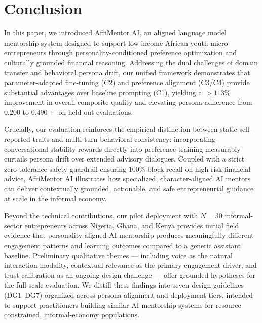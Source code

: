 \section{Conclusion}
\label{sec:conclusion}

In this paper, we introduced AfriMentor AI, an aligned language model mentorship system designed to support low-income African youth micro-entrepreneurs through personality-conditioned preference optimization and culturally grounded financial reasoning. Addressing the dual challenges of domain transfer and behavioral persona drift, our unified framework demonstrates that parameter-adapted fine-tuning (C2) and preference alignment (C3/C4) provide substantial advantages over baseline prompting (C1), yielding a $>113\%$ improvement in overall composite quality and elevating persona adherence from $0.200$ to $0.490+$ on held-out evaluations.

Crucially, our evaluation reinforces the empirical distinction between static self-reported traits and multi-turn behavioral consistency: incorporating conversational stability rewards directly into preference training measurably curtails persona drift over extended advisory dialogues. Coupled with a strict zero-tolerance safety guardrail ensuring $100\%$ block recall on high-risk financial advice, AfriMentor AI illustrates how specialized, character-aligned AI mentors can deliver contextually grounded, actionable, and safe entrepreneurial guidance at scale in the informal economy.

Beyond the technical contributions, our pilot deployment with $N=30$ informal-sector entrepreneurs across Nigeria, Ghana, and Kenya provides initial field evidence that personality-aligned AI mentorship produces meaningfully different engagement patterns and learning outcomes compared to a generic assistant baseline. Preliminary qualitative themes --- including voice as the natural interaction modality, contextual relevance as the primary engagement driver, and trust calibration as an ongoing design challenge --- offer grounded hypotheses for the full-scale evaluation. We distill these findings into seven design guidelines (DG1--DG7) organized across persona-alignment and deployment tiers, intended to support practitioners building similar AI mentorship systems for resource-constrained, informal-economy populations.

